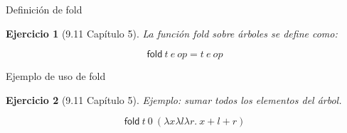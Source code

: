 \documentclass[11pt]{beamer}
\newtheorem{exercise}{Ejercicio}
\begin{document}
\begin{frame}{Definición de fold}
	\begin{exercise}[9.11 Capítulo 5]
		La función \textsf{fold} sobre árboles se define como:
		
		\[
		\textsf{fold}\ t\ e\ op = t\ e\ op
		\]
		

	\end{exercise}
\end{frame}

\begin{frame}{Ejemplo de uso de fold}
	\begin{exercise}[9.11 Capítulo 5]
		Ejemplo: sumar todos los elementos del árbol.
		
		\[
		\textsf{fold}\ t\ 0\ (\lambda x\lambda l\lambda r.\ x + l + r)
		\]
		
	\end{exercise}
\end{frame}
\end{document}
